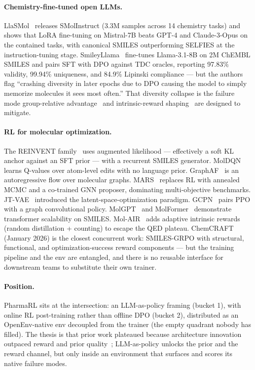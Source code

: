 \documentclass[11pt,a4paper]{article}
\begin{document}
\paragraph{Chemistry-fine-tuned open LLMs.} LlaSMol~\cite{yu2024llasmol} releases SMolInstruct (3.3M samples across 14 chemistry tasks) and shows that LoRA fine-tuning on Mistral-7B beats GPT-4 and Claude-3-Opus on the contained tasks, with canonical SMILES outperforming SELFIES at the instruction-tuning stage. SmileyLlama~\cite{cavanagh2024smileyllama} fine-tunes Llama-3.1-8B on 2M ChEMBL SMILES and pairs SFT with DPO against TDC oracles, reporting 97.83\% validity, 99.94\% uniqueness, and 84.9\% Lipinski compliance --- but the authors flag ``crashing diversity in later epochs due to DPO causing the model to simply memorize molecules it sees most often.'' That diversity collapse is the failure mode group-relative advantage~\cite{shao2024deepseekmath} and intrinsic-reward shaping~\cite{lim2024molair} are designed to mitigate.

\paragraph{RL for molecular optimization.} The REINVENT family~\cite{olivecrona2017reinvent,blaschke2020reinvent2,loeffler2024reinvent4} uses augmented likelihood --- effectively a soft KL anchor against an SFT prior --- with a recurrent SMILES generator. MolDQN~\cite{zhou2019moldqn} learns Q-values over atom-level edits with no language prior. GraphAF~\cite{shi2020graphaf} is an autoregressive flow over molecular graphs. MARS~\cite{xie2021mars} replaces RL with annealed MCMC and a co-trained GNN proposer, dominating multi-objective benchmarks. JT-VAE~\cite{jin2018jtvae} introduced the latent-space-optimization paradigm. GCPN~\cite{you2018gcpn} pairs PPO with a graph convolutional policy. MolGPT~\cite{bagal2021molgpt} and MolFormer~\cite{ross2022molformer} demonstrate transformer scalability on SMILES. Mol-AIR~\cite{lim2024molair} adds adaptive intrinsic rewards (random distillation + counting) to escape the QED plateau. ChemCRAFT~\cite{chemcraft2026} (January 2026) is the closest concurrent work: SMILES-GRPO with structural, functional, and optimization-success reward components --- but the training pipeline and the env are entangled, and there is no reusable interface for downstream teams to substitute their own trainer.

\paragraph{Position.} PharmaRL sits at the intersection: an LLM-as-policy framing (bucket 1), with online RL post-training rather than offline DPO (bucket 2), distributed as an OpenEnv-native env decoupled from the trainer (the empty quadrant nobody has filled). The thesis is that prior work plateaued because architecture innovation outpaced reward and prior quality~\cite{gao2022pmo,renz2020failure}; LLM-as-policy unlocks the prior and the reward channel, but only inside an environment that surfaces and scores its native failure modes.
\end{document}
